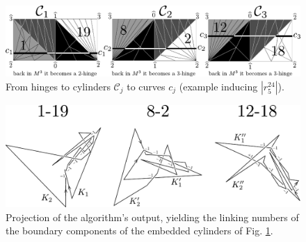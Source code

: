 \begin{figure}[!htb]
\begin{center}
\includegraphics[width=15cm]{A.figs/strips.pdf}
\caption{From hinges to cylinders 
$\mathcal{C}_j$  to curves  $c_j$ (example inducing  $|r^{24}_5|$).
}  
\label{fig:strips}
\end{center}
\end{figure}

\begin{figure}[!htb]
\begin{center}
\includegraphics[scale=0.9]{A.figs/projecoes2.pdf}
\caption{Projection of the algorithm's output, yielding 
the linking numbers of the 
boundary components of the embedded cylinders of Fig. \ref{fig:strips}.}
\label{fig:projecoes2}
\end{center}
\end{figure}




